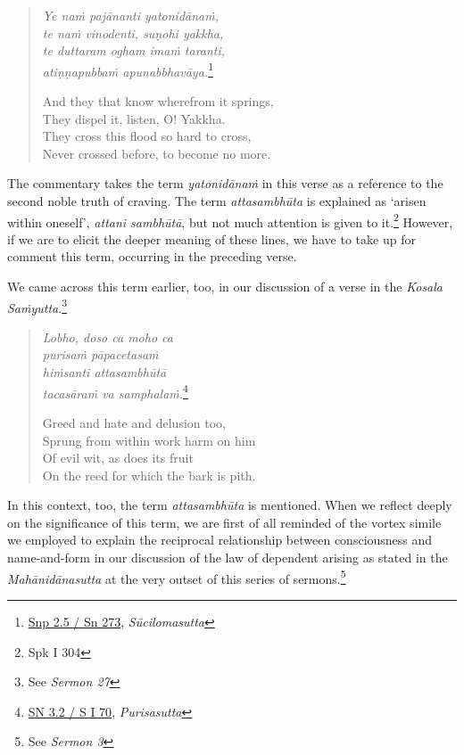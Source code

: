 \begin{quote}
\emph{Ye naṁ pajānanti yatonidānaṁ,}\\
\emph{te naṁ vinodenti, suṇohi yakkha,}\\
\emph{te duttaram ogham imaṁ taranti,}\\
\emph{atiṇṇapubbaṁ apunabbhavāya.}\footnote{\href{https://suttacentral.net/snp2.5/pli/ms}{Snp 2.5 / Sn 273}, \emph{Sūcilomasutta}}

And they that know wherefrom it springs,\\
They dispel it, listen, O! Yakkha.\\
They cross this flood so hard to cross,\\
Never crossed before, to become no more.
\end{quote}

The commentary takes the term \emph{yatonidānaṁ} in this verse as a reference to the second noble truth of craving. The term \emph{attasambhūta} is explained as `arisen within oneself', \emph{attani sambhūtā}, but not much attention is given to it.\footnote{Spk I 304} However, if we are to elicit the deeper meaning of these lines, we have to take up for comment this term, occurring in the preceding verse.

We came across this term earlier, too, in our discussion of a verse in the \emph{Kosala Saṁyutta}.\footnote{See \emph{Sermon 27}}

\begin{quote}
\emph{Lobho, doso ca moho ca}\\
\emph{purisaṁ pāpacetasaṁ}\\
\emph{hiṁsanti attasambhūtā}\\
\emph{tacasāraṁ va samphalaṁ.}\footnote{\href{https://suttacentral.net/sn3.2/pli/ms}{SN 3.2 / S I 70}, \emph{Purisasutta}}

Greed and hate and delusion too,\\
Sprung from within work harm on him\\
Of evil wit, as does its fruit\\
On the reed for which the bark is pith.
\end{quote}

In this context, too, the term \emph{attasambhūta} is mentioned. When we reflect deeply on the significance of this term, we are first of all reminded of the vortex simile we employed to explain the reciprocal relationship between consciousness and name-and-form in our discussion of the law of dependent arising as stated in the \emph{Mahānidānasutta} at the very outset of this series of sermons.\footnote{See \emph{Sermon 3}}

